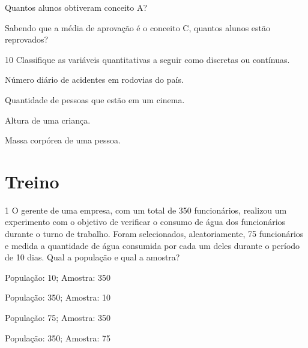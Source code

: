 \begin{escolha}
\item
  Quantos alunos obtiveram conceito A?\\

\item
  Sabendo que a média de aprovação é o conceito C, quantos alunos estão
  reprovados?\\
\end{escolha}

\num{10} Classifique as variáveis quantitativas a seguir como discretas
ou contínuas.


\begin{escolha}
\item
  Número diário de acidentes em rodovias do país.\\

\item
  Quantidade de pessoas que estão em um cinema.\\

\item
  Altura de uma criança.\\

\item
  Massa corpórea de uma pessoa.\\
\end{escolha}

\section*{Treino}

\num{1} O gerente de uma empresa, com um total de 350 funcionários,
realizou um experimento com o objetivo de verificar o consumo de água
dos funcionários durante o turno de trabalho. Foram selecionados,
aleatoriamente, 75 funcionários e medida a quantidade de água consumida
por cada um deles durante o período de 10 dias. Qual a população e qual
a amostra?

\begin{escolha}
\item
  População: 10; Amostra: 350
\item
  População: 350; Amostra: 10
\item
  População: 75; Amostra: 350
\item
  População: 350; Amostra: 75
\end{escolha}


